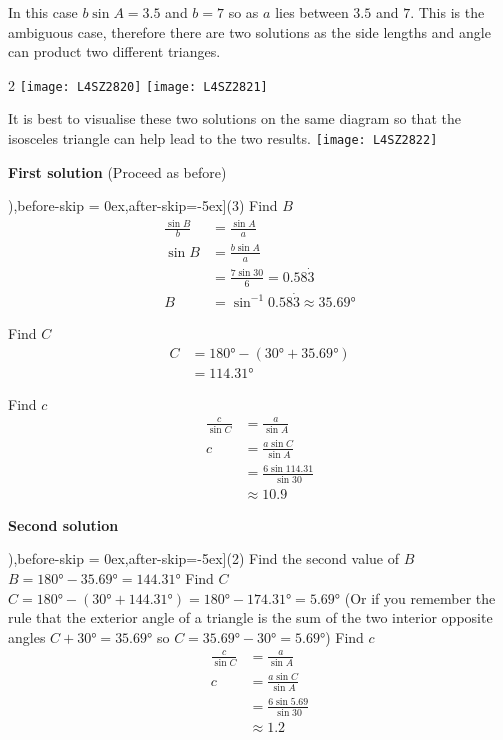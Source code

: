 In this case $b \sin  A =3.5$ and $b =7$ so as $a$ lies between $3.5$ and $7$. This is the ambiguous case, therefore there are two solutions as the side lengths and angle can product two different trianges.
\columnsep =30pt
\begin {multicols}{2}
\texttt{[image: L4SZ2820]}
\texttt{[image: L4SZ2821]}
\end {multicols}
It is best to visualise these two solutions on the same diagram so that the isosceles triangle can help lead to the two results. 
\texttt{[image: L4SZ2822]}

\textbf{First solution} (Proceed as before) 
\begin{tasks}[counter-format=(tsk[1]),before-skip = {0ex},after-skip={-5ex}](3)
	\task Find $B$
\begin{align*}\frac{\sin  B}{b} &  = \frac{\sin  A}{a} \\
\sin  B &  = \frac{b \sin  A}{a} \\
&  = \frac{7 \sin  30 }{6} =0.58 \dot{3} \\
B &  = \sin ^{ -1} 0.58 \dot{3} \approx \ang{35.69} \end{align*}

\task Find $C$
\begin{align*}C &  = \ang{180}  -(\ang{30}  +\ang{35.69} ) \\
&  = \ang{114.31} \end{align*}

\task Find $c$
\begin{align*}\frac{c}{\sin  C} &  = \frac{a}{\sin  A} \\
c &  = \frac{a \sin  C}{\sin  A} \\
&  = \frac{6 \sin  114.31 }{\sin  30 } \\
&  \approx   10.9\end{align*}
\end{tasks}
\textbf{Second solution} 
\begin{tasks}[counter-format=(tsk[1]),before-skip = {0ex},after-skip={-5ex}](2)
	\task Find the second value of $B$ \\
$B =\ang{180}  -\ang{35.69}  =\ang{144.31} $
\task Find $C$\\
$C =\ang{180} -(\ang{30}  +\ang{144.31} ) =\ang{180}  -\ang{174.31}  =\ang{5.69} $
\task*[](Or if you remember the rule that the exterior angle of a triangle is the sum of the two interior
opposite angles $C +\ang{30}  =\ang{35.69} $ so $C =\ang{35.69}  -\ang{30}  =\ang{5.69} $) 
\task*[(3)] Find $c$
\begin{align*}\frac{c}{\sin  C} &  = \frac{a}{\sin  A} \\
c &  = \frac{a \sin  C}{\sin  A} \\
&  = \frac{6 \sin  5.69 }{\sin  30 } \\
&  \approx   1.2\end{align*}
\end{tasks}

